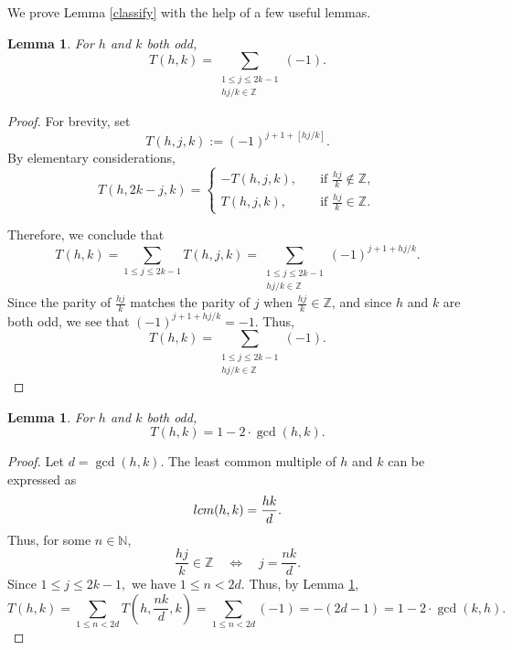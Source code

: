 \documentclass[11pt,reqno]{amsart}
\theoremstyle{plain}
\numberwithin{equation}{section}
\newtheorem{lemma}[theorem]{Lemma}
\begin{document}
We prove Lemma \ref{classify} with the help of a few useful lemmas.


\begin{lemma}\label{g2} For $h$ and $k$ both odd,
$$T(h,k) = \sum\limits_{\substack{1\leq j \leq 2k - 1 \\ hj/k \in \mathbb{Z}}} (-1).$$
\end{lemma}

\begin{proof}
For brevity, set
$$ T(h,j,k):=(-1)^{j+1+[hj/k]}.$$
By elementary considerations,
\begin{equation*}
T(h,2k-j,k)=\begin{cases} -T(h,j,k),\quad &\text{if } \frac{hj}{k} \notin \mathbb{Z},\\
T(h,j,k),\quad &\text{if } \frac{hj}{k} \in \mathbb{Z}.
\end{cases}
\end{equation*}

Therefore, we conclude that
$$T(h,k)=\sum\limits_{1\leq j \leq 2k-1}T(h,j,k) = \sum\limits_{\substack{1\leq j \leq 2k - 1 \\ hj/k\in \mathbb{Z}}}(-1)^{j+1+hj/k}.$$
Since the parity of $\frac{hj}{k}$ matches the parity of $j$ when $\frac{hj}{k}\in\mathbb{Z}$, and since $h$ and $k$ are both odd, we see that
$(-1)^{j+1+hj/k} = -1.$
Thus,
$$T(h,k) = \sum\limits_{\substack{1\leq j \leq 2k - 1 \\ hj/k \in \mathbb{Z}}} (-1).$$
\end{proof}

\begin{lemma}\label{g3} For $h$ and $k$ both odd,
$$T(h,k) = 1 - 2\cdot \gcd(h,k). $$
\end{lemma}
\begin{proof}
Let $d=\gcd(h,k)$. The least common multiple of $h$ and $k$ can be expressed as
$${\rm lcm}(h,k)=\frac{h k}{d}.$$
Thus, for some $n \in \mathbb{N}$,
$$\frac{hj}{k}\in\mathbb{Z}\quad \Leftrightarrow \quad j=\frac{n k}{d}.$$
Since $1\leq j\leq 2k-1,$ we have $1\leq n< 2d.$ Thus, by Lemma \ref{g2},
$$T(h,k)=\sum\limits_{1\leq n<2d}T\left(h,\frac{nk}{d},k\right) = \sum\limits_{1\leq n<2d} (-1) = -(2d-1) = 1- 2\cdot \gcd(k,h).$$
\end{proof}
\end{document}
